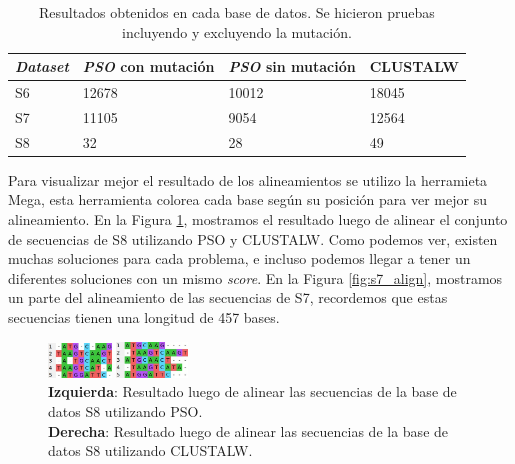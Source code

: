 \documentclass[conference]{IEEEtran}
\begin{document}
\begin{table}[h]
	\centering
	\caption{Resultados obtenidos en cada base de datos. Se hicieron pruebas incluyendo y excluyendo la mutación.}
	\begin{tabular}{p{1cm}p{1.5cm}p{1.5cm}p{1cm}}
		
		\textbf{\textit{Dataset}} & \textbf{\textit{PSO} con mutación}  & \textbf{\textit{PSO} sin mutación} & \textbf{CLUSTALW} \\
		\hline			
		S6	& 12678	& 10012	& 18045 \\				
		S7 & 11105 & 9054 & 12564 \\
		S8 & 32 & 28 & 49 \\ 				
		\hline 
	\end{tabular}		
	\label{tab:result}
\end{table}


Para visualizar mejor el resultado de los alineamientos se utilizo la herramieta Mega, esta herramienta colorea cada base según su posición para ver mejor su alineamiento. En la Figura \ref{fig:s8_align}, mostramos el resultado luego de alinear el conjunto de secuencias de S8 utilizando PSO y CLUSTALW. Como podemos ver, existen muchas soluciones para cada problema, e incluso podemos llegar a tener un diferentes soluciones con un mismo \textit{score}. En la Figura \ref{fig:s7_align}, mostramos un parte del alineamiento de las secuencias de S7, recordemos que estas secuencias tienen una longitud de 457 bases.


\begin{figure}[h]
	\centering
	\begin{multicols}{2}
		\includegraphics[width=0.15\textwidth]{images/s8_align}\par 
		\includegraphics[width=0.17\textwidth]{images/s8_align_mega}\par 
	\end{multicols}
	\caption{\textbf{Izquierda}: Resultado luego de alinear las secuencias de la base de datos S8 utilizando PSO.\\  \textbf{Derecha}: Resultado luego de alinear las secuencias de la base de datos S8 utilizando CLUSTALW.}
	\label{fig:s8_align}
\end{figure}
\end{document}
